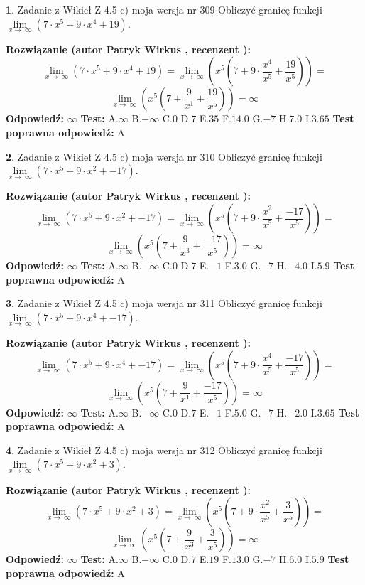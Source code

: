 \documentclass[12pt, a4paper]{article}
\theoremstyle{definition} %
\newtheorem{zad}{}
\newcommand{\zadStart}[1]{\begin{zad}#1\newline}
\newcommand{\zadStop}{\end{zad}}
\newcommand{\rozwStart}[2]{\noindent \textbf{Rozwiązanie (autor #1 , recenzent #2): }\newline}
\newcommand{\rozwStop}{\newline}
\newcommand{\odpStart}{\noindent \textbf{Odpowiedź:}\newline}
\newcommand{\odpStop}{\newline}
\newcommand{\testStart}{\noindent \textbf{Test:}\newline}
\newcommand{\testStop}{\newline}
\newcommand{\kluczStart}{\noindent \textbf{Test poprawna odpowiedź:}\newline}
\newcommand{\kluczStop}{\newline}
\begin{document}
\zadStart{Zadanie z Wikieł Z 4.5 c) moja wersja nr 309}
Obliczyć granicę funkcji  $\lim\limits_{x\to\ \infty}(7 \cdot x^{5}+9 \cdot x^{4}+19)$.
\zadStop
\rozwStart{Patryk Wirkus}{}
$$\lim\limits_{x\to\ \infty}(7 \cdot x^{5}+9 \cdot x^{4}+19) = \lim\limits_{x\to\ \infty}(x^{5}(7 +9 \cdot \frac{x^{4}}{x^{5}}+\frac{19}{x^{5}})) =$$ $$\lim\limits_{x\to\ \infty}(x^{5}(7 +\frac{9}{x^{1}}+\frac{19}{x^{5}})) =\infty$$
\rozwStop
\odpStart
$\infty$
\odpStop
\testStart
A.$\infty$ B.$-\infty$ C.$0$ D.$7$ E.$35$
F.$14.0$ G.$-7$
H.$7.0$
I.$3.65$
\testStop
\kluczStart
A
\kluczStop



\zadStart{Zadanie z Wikieł Z 4.5 c) moja wersja nr 310}
Obliczyć granicę funkcji  $\lim\limits_{x\to\ \infty}(7 \cdot x^{5}+9 \cdot x^{2}+-17)$.
\zadStop
\rozwStart{Patryk Wirkus}{}
$$\lim\limits_{x\to\ \infty}(7 \cdot x^{5}+9 \cdot x^{2}+-17) = \lim\limits_{x\to\ \infty}(x^{5}(7 +9 \cdot \frac{x^{2}}{x^{5}}+\frac{-17}{x^{5}})) =$$ $$\lim\limits_{x\to\ \infty}(x^{5}(7 +\frac{9}{x^{3}}+\frac{-17}{x^{5}})) =\infty$$
\rozwStop
\odpStart
$\infty$
\odpStop
\testStart
A.$\infty$ B.$-\infty$ C.$0$ D.$7$ E.$-1$
F.$3.0$ G.$-7$
H.$-4.0$
I.$5.9$
\testStop
\kluczStart
A
\kluczStop



\zadStart{Zadanie z Wikieł Z 4.5 c) moja wersja nr 311}
Obliczyć granicę funkcji  $\lim\limits_{x\to\ \infty}(7 \cdot x^{5}+9 \cdot x^{4}+-17)$.
\zadStop
\rozwStart{Patryk Wirkus}{}
$$\lim\limits_{x\to\ \infty}(7 \cdot x^{5}+9 \cdot x^{4}+-17) = \lim\limits_{x\to\ \infty}(x^{5}(7 +9 \cdot \frac{x^{4}}{x^{5}}+\frac{-17}{x^{5}})) =$$ $$\lim\limits_{x\to\ \infty}(x^{5}(7 +\frac{9}{x^{1}}+\frac{-17}{x^{5}})) =\infty$$
\rozwStop
\odpStart
$\infty$
\odpStop
\testStart
A.$\infty$ B.$-\infty$ C.$0$ D.$7$ E.$-1$
F.$5.0$ G.$-7$
H.$-2.0$
I.$3.65$
\testStop
\kluczStart
A
\kluczStop



\zadStart{Zadanie z Wikieł Z 4.5 c) moja wersja nr 312}
Obliczyć granicę funkcji  $\lim\limits_{x\to\ \infty}(7 \cdot x^{5}+9 \cdot x^{2}+3)$.
\zadStop
\rozwStart{Patryk Wirkus}{}
$$\lim\limits_{x\to\ \infty}(7 \cdot x^{5}+9 \cdot x^{2}+3) = \lim\limits_{x\to\ \infty}(x^{5}(7 +9 \cdot \frac{x^{2}}{x^{5}}+\frac{3}{x^{5}})) =$$ $$\lim\limits_{x\to\ \infty}(x^{5}(7 +\frac{9}{x^{3}}+\frac{3}{x^{5}})) =\infty$$
\rozwStop
\odpStart
$\infty$
\odpStop
\testStart
A.$\infty$ B.$-\infty$ C.$0$ D.$7$ E.$19$
F.$13.0$ G.$-7$
H.$6.0$
I.$5.9$
\testStop
\kluczStart
A
\kluczStop
\end{document}
